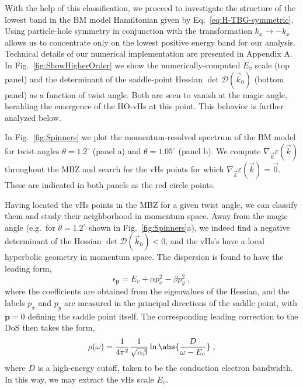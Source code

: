 With the help of this classification, we proceed to investigate the structure of the lowest band in the BM model Hamiltonian given by Eq.~\eqref{eq:H-TBG-symmetric}. Using particle-hole symmetry in conjunction with the transformation $k_x\to -k_x$ allows us to concentrate only on the lowest positive energy band for our analysis. Technical details of our numerical implementation are presented in  Appendix A. In Fig.~\ref{fig:ShowHigherOrder} we show the numerically-computed $E_v$ scale (top panel) and the determinant of the saddle-point Hessian $\operatorname{det} \mathcal{D}(\vec{k}_0)$ (bottom panel) as a function of twist angle. Both are seen to vanish at the magic angle, heralding the emergence of the HO-vHs at this point. This behavior is further analyzed below.

In Fig.~\ref{fig:Spinners} we plot the momentum-resolved spectrum of the BM model for twist angles $\theta=1.2^{\circ}$ (panel a) and $\theta=1.05^{\circ}$ (panel b). We compute $\nabla_{\vec{k}} \varepsilon(\vec{k})$ throughout the MBZ and search for the vHs points for which $\nabla_{\vec{k}} \varepsilon(\vec{k})=\vec{0}$. These are indicated in both panels as the red circle points. 

Having located the vHs points in the MBZ for a given twist angle, we can classify them and study their neighborhood in momentum space. Away from the magic angle (e.g.~for $\theta=1.2^{\circ}$ shown in Fig.~\ref{fig:Spinners}a), we indeed find a negative determinant of the Hessian $\operatorname{det} \mathcal{D}(\vec{k}_0)<0$, and the vHs's have a local hyperbolic geometry in momentum space. The dispersion is found to have the leading form,
\begin{equation}
	\epsilon_{\mathbf{p}} = E_v + \alpha p_x^2 - \beta p_y^2 \;, 
	\label{eq:Logdispersion}
\end{equation}
where the coefficients are obtained from the eigenvalues of the Hessian, and the labels $p_x$ and $p_y$ are measured in the principal directions of the saddle point, with $\mathbf{p}=0$ defining the saddle point itself. The corresponding leading correction to the DoS then takes the form,
\begin{equation}
	\rho(\omega) = \frac{1}{4\pi^2}\frac{1}{\sqrt{\alpha\beta}}\ln \abs{\frac{D}{\omega-E_v}} \;,
	\label{eq:logDOS}
\end{equation}
where $D$ is a high-energy cutoff, taken to be the conduction electron bandwidth. In this way, we may extract the vHs scale $E_v$.

